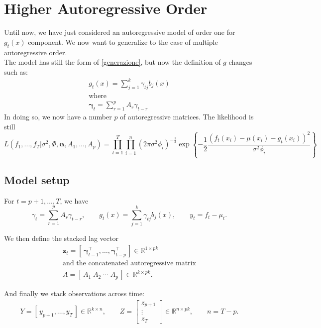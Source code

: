 \section{Higher Autoregressive Order}
Until now, we have just considered an autoregressive model of order one for $g_t(x)$ component. We now want to generalize to the case of multiple autoregressive order. \\
The model has still the form of \ref{generazione}, but now the definition of $g$ changes such as: 
\begin{gather*}
    g_t(x) = \sum_{j=1}^k \gamma_{tj}b_j(x) \\
    \text{where} \\
    \boldsymbol{\gamma}_t = \sum_{r=1}^p A_r \gamma_{t - r}
\end{gather*}
In doing so, we now have a number $p$ of autoregressive matrices. 
The likelihood is still 
\begin{equation}
    L(f_1, ..., f_T | \sigma^2, \Phi, \boldsymbol{\alpha}, A_1, ..., A_p) = \prod_{t=1}^T \prod_{i=1}^n (2 \pi \sigma^2 \phi_i)^{-\frac{1}{2}} \exp \left\{- \frac{1}{2} \frac{\left(f_t(x_i) - \mu(x_i) - g_t(x_i)\right)^2}{\sigma^2 \phi_i} \right\}
\end{equation}

\subsection{Model setup}

For \(t = p+1, \ldots, T\), we have
\begin{equation*}
    \gamma_t = \sum_{r=1}^p A_r \gamma_{t-r}, \qquad
    g_t(x) = \sum_{j=1}^k \gamma_{tj} b_j(x), \qquad
    y_t = f_t - \mu_t.
\end{equation*}


We then define the stacked lag vector
\begin{gather*}
\textbf{z}_t = [\, \boldsymbol{\gamma}_{t-1}^\top, \ldots, \boldsymbol{\gamma}_{t-p}^\top \,] \in \mathbb{R}^{1 \times pk} \\
\text{and the concatenated autoregressive matrix} \\
A = [\, A_1 \; A_2 \; \cdots \; A_p \,] \in \mathbb{R}^{k \times pk}.
\end{gather*}

And finally we stack observations across time:
\begin{gather*}
Y = [\, y_{p+1}, \ldots, y_T \,] \in \mathbb{R}^{k \times n}, \qquad
Z = \begin{bmatrix}
z_{p+1} \\ \vdots \\ z_T
\end{bmatrix} \in \mathbb{R}^{n \times pk}, \qquad n = T - p.
\end{gather*}

